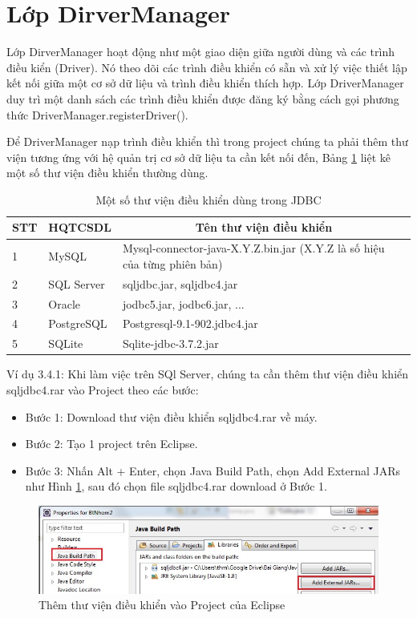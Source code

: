 \section{Lớp DirverManager}
Lớp  DirverManager hoạt động như một giao diện giữa người dùng và các trình điều kiển (Driver). Nó theo dõi các trình điều khiển có sẵn và xử lý việc thiết lập kết nối giữa một cơ sở dữ liệu và trình điều khiển thích hợp. Lớp DriverManager duy trì một danh sách các trình điều khiển được đăng ký  bằng cách gọi phương thức DriverManager.registerDriver().

Để DriverManager nạp trình điều khiển thì trong project chúng ta phải thêm thư viện tương ứng với hệ quản trị cơ sở dữ liệu ta cần kết nối đến, Bảng \ref{bang31} liệt kê một số thư viện điều khiển thường dùng.
\begin{center}
	\begin{longtable}{|m{1cm}|m{3cm}|m{7cm}|}
		\caption[Một số thư viện điều khiển dùng trong JDBC]{Một số thư viện điều khiển dùng trong JDBC}
		\label{bang31}
		\endfirsthead
		\endhead
		\hline
		\multicolumn{1}{|c|}{\textbf{STT}} &\multicolumn{1}{c|}{	\textbf{ HQTCSDL}}
			&\multicolumn{1}{c|}{	\textbf{Tên thư viện điều khiển}}\\ \hline
	1&	MySQL & 	Mysql-connector-java-X.Y.Z.bin.jar (X.Y.Z là số hiệu của từng phiên bản) \\ \hline
	2&SQL Server &	sqljdbc.jar, sqljdbc4.jar \\ \hline
	3&	Oracle &	jodbc5.jar, jodbc6.jar, ... \\ \hline 
	4&	PostgreSQL &	Postgresql-9.1-902.jdbc4.jar \\ \hline 
	5&	SQLite &	Sqlite-jdbc-3.7.2.jar\\ \hline 
	\end{longtable}
\end{center}
\vspace{-1cm}
Ví dụ 3.4.1: Khi làm việc trên SQl Server, chúng ta cần thêm thư viện điều khiển sqljdbc4.rar vào Project  theo các bước:
\begin{itemize}
	\item Bước 1: Download thư viện điều  khiển sqljdbc4.rar về máy.
	\item Bước 2: Tạo 1 project trên Eclipse.
	\item Bước 3: Nhấn Alt + Enter, chọn Java Build Path, chọn Add External JARs như Hình \ref{hinh33}, sau đó chọn file  sqljdbc4.rar download ở Bước 1.

\end{itemize}
	\begin{figure}[!ht]
	\centering
	\includegraphics[scale=0.8]{Figures//Hinh33.jpg}
	\caption{ Thêm thư viện điều khiển vào Project của Eclipse }\label{hinh33} 
\end{figure}

